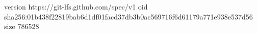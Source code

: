 version https://git-lfs.github.com/spec/v1
oid sha256:01b438f22819bab6d1df01facd37db3b0ac569716f6d61179a771e938e537d56
size 786528
